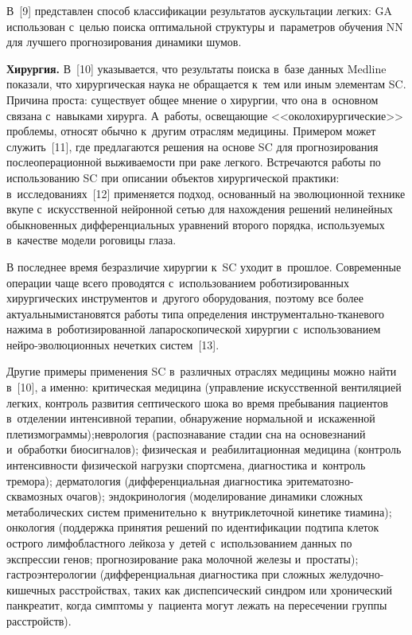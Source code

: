 \begin{multicols}{2}
     В~[9] представлен способ классификации результатов аускультации 
легких: GA использован с~целью поиска оптимальной структуры и~па\-ра\-мет\-ров 
обучения NN для лучшего прогнозирования динамики шумов.
     
     \textbf{Хирургия.} В~[10] указывается, что результаты поиска в~базе 
данных Medline показали, что хирургическая наука не обращается к~тем или 
иным элементам SC. Причина проста: существует общее мнение о хирургии, 
что она в~основном связана с~навыками хирурга. А~работы, освещающие 
<<околохирургические>> проблемы, относят обычно к~другим отраслям 
медицины. Примером может служить~[11], где предлагаются решения на 
основе SC для прогнозирования послеоперационной выживаемости при раке 
легкого. Встречаются работы по использованию SC при описании объектов 
хирургической практики: в~исследованиях~[12] применяется подход, 
основанный на эволюционной технике вкупе с~искусственной нейронной сетью 
для нахождения решений нелинейных обыкновенных дифференциальных 
уравнений второго порядка, используемых в~качестве модели роговицы глаза.
     
     В последнее время безразличие хирургии к~SC уходит в~прошлое. 
Современные операции чаще всего проводятся с~использованием 
роботизированных хирургических инструментов и~другого обору\-до\-ва\-ния, 
поэтому все более актуальными\linebreak становятся работы типа определения  
инстру\-мен\-таль\-но-тка\-не\-во\-го нажима в~роботизированной 
лапароскопической хирургии с~использованием нейро-эволюционных нечетких 
сис\-тем~[13].
     
     Другие примеры применения SC в~различных отраслях медицины можно 
найти в~[10], а именно: критическая медицина (управление искусственной\linebreak 
вентиляцией легких, контроль развития септического шока во время 
пребывания пациентов в~отделении интенсивной терапии, обнаружение 
нормальной и~искаженной плетизмограммы);\linebreak \mbox{неврология} (распознавание 
стадии сна на основе\linebreak знаний и~обработки биосигналов); физическая\linebreak 
и~реабилитационная медицина (контроль ин\-тен\-сив\-ности физической нагрузки 
спортсмена, диагностика и~контроль тремора); дерматология\linebreak 
(дифференциальная диагностика эри\-те\-ма\-тоз\-но-сква\-моз\-ных очагов); 
эндокринология (моделирование динамики сложных метаболических сис\-тем 
применительно к~внут\-ри\-кле\-точ\-ной кинетике тиамина); онкология (поддержка 
принятия решений по идентификации подтипа клеток острого лимфобластного 
лейкоза у~детей с~использованием данных по экспрессии генов; 
прогнозирование рака молочной железы и~простаты); гастроэнтерологии 
(дифференциальная диагностика при сложных же\-лу\-доч\-но-ки\-шеч\-ных 
расстройствах, таких как диспепсический синд\-ром или хронический 
панкреатит, когда симп\-то\-мы у~пациента могут лежать на пересечении группы 
расстройств).
     

\end{multicols}
